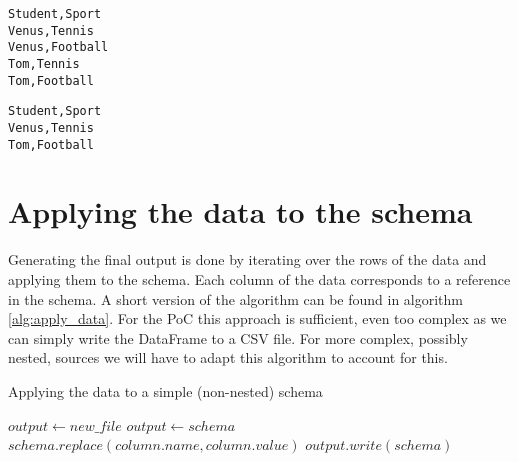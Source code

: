 \begin{lstlisting}[caption={Bad join result}, label={lst:bad_join_result}, captionpos=b, basicstyle=\small]
Student,Sport
Venus,Tennis
Venus,Football
Tom,Tennis
Tom,Football
\end{lstlisting}

\begin{lstlisting}[caption={Bad join original source}, label={lst:bad_join_expected_result}, captionpos=b]
Student,Sport
Venus,Tennis
Tom,Football
\end{lstlisting}

\section{Applying the data to the schema}
\label{section:applying_data}
Generating the final output is done by iterating over the rows of the data and applying them to the schema. Each column of the data corresponds to a reference in the schema. A short version of the algorithm can be found in algorithm \ref{alg:apply_data}. For the PoC this approach is sufficient, even too complex as we can simply write the DataFrame to a CSV file. For more complex, possibly nested, sources we will have to adapt this algorithm to account for this.

\begin{algorithm}
    \caption{Applying the data to a simple (non-nested) schema}
    \label{alg:apply_data}
    \begin{algorithmic}[1]
        \State $output \gets new\_file$
            \State $output \gets schema$
                \State $schema.replace(column.name, column.value)$
            \EndFor
            \State $output.write(schema)$
        \EndFor
    \end{algorithmic}
\end{algorithm}